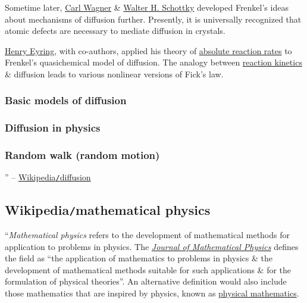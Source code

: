 \documentclass{article}
\begin{document}
Sometime later, \href{https://en.wikipedia.org/wiki/Carl_Wagner}{\sc Carl Wagner} \& \href{https://en.wikipedia.org/wiki/Walter_H._Schottky}{\sc Walter H. Schottky} developed Frenkel's ideas about mechanisms of diffusion further. Presently, it is universally recognized that atomic defects are necessary to mediate diffusion in crystals.

\href{https://en.wikipedia.org/wiki/Henry_Eyring_(chemist)}{\sc Henry Eyring}, with co-authors, applied his theory of \href{https://en.wikipedia.org/wiki/Transition_state_theory}{absolute reaction rates} to Frenkel's quasichemical model of diffusion. The analogy between \href{https://en.wikipedia.org/wiki/Chemical_kinetics}{reaction kinetics} \& diffusion leads to various nonlinear versions of Fick's law.

\subsubsection{Basic models of diffusion}

\subsubsection{Diffusion in physics}

\subsubsection{Random walk (random motion)}

'' -- \href{https://en.wikipedia.org/wiki/Diffusion}{Wikipedia{\tt/}diffusion}



\subsection{Wikipedia{\tt/}mathematical physics}
``{\it Mathematical physics} refers to the development of mathematical methods for application to problems in physics. The \href{https://en.wikipedia.org/wiki/Journal_of_Mathematical_Physics}{\it Journal of Mathematical Physics} defines the field as ``the application of mathematics to problems in physics \& the development of mathematical methods suitable for such applications \& for the formulation of physical theories''. An alternative definition would also include those mathematics that are inspired by physics, known as \href{https://en.wikipedia.org/wiki/Physical_mathematics}{physical mathematics}.
\end{document}
